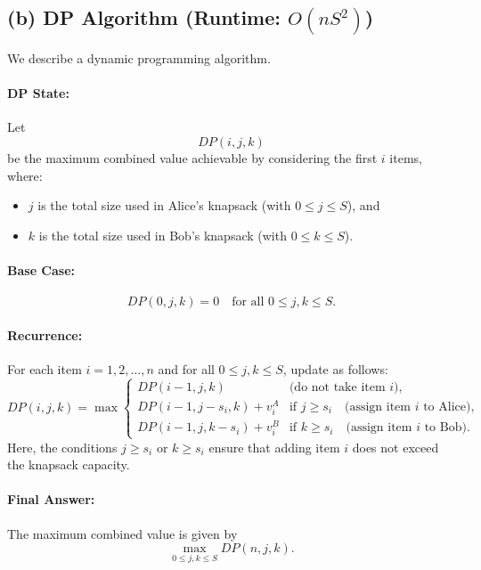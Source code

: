 \documentclass[11pt]{article}
\begin{document}
    \subsection*{(b) DP Algorithm (Runtime: \(O(nS^2)\))}
    
    We describe a dynamic programming algorithm.
    
    \paragraph{DP State:} Let 
    \[
    DP(i,j,k)
    \]
    be the maximum combined value achievable by considering the first \(i\) items, where:
    \begin{itemize}
        \item \(j\) is the total size used in Alice's knapsack (with \(0\le j\le S\)), and
        \item \(k\) is the total size used in Bob's knapsack (with \(0\le k\le S\)).
    \end{itemize}
    
    \paragraph{Base Case:}
    \[
    DP(0,j,k) = 0 \quad \text{for all } 0\le j,k \le S.
    \]
    
    \paragraph{Recurrence:} For each item \(i=1,2,\ldots,n\) and for all \(0\le j,k\le S\), update as follows:
    \[
    DP(i,j,k) = \max \begin{cases}
    DP(i-1, j, k) & \text{(do not take item } i\text{)}, \\[1mm]
    DP(i-1, j-s_i, k) + v_i^A & \text{if } j \ge s_i \quad \text{(assign item } i \text{ to Alice)}, \\[1mm]
    DP(i-1, j, k-s_i) + v_i^B & \text{if } k \ge s_i \quad \text{(assign item } i \text{ to Bob)}.
    \end{cases}
    \]
    Here, the conditions \(j\ge s_i\) or \(k\ge s_i\) ensure that adding item \(i\) does not exceed the knapsack capacity.
    
    \paragraph{Final Answer:}
    The maximum combined value is given by
    \[
    \max_{0\le j,k\le S} DP(n,j,k).
    \]
    
\end{document}
